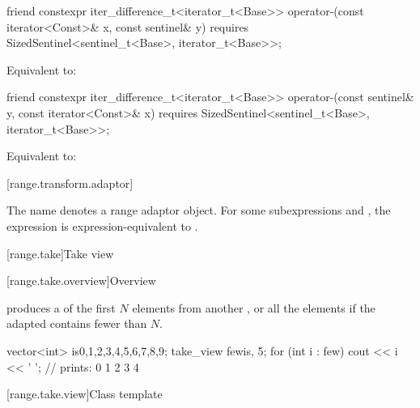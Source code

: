 %
\begin{itemdecl}
friend constexpr iter_difference_t<iterator_t<Base>>
  operator-(const iterator<Const>& x, const sentinel& y)
    requires SizedSentinel<sentinel_t<Base>, iterator_t<Base>>;
\end{itemdecl}

\begin{itemdescr}
\pnum
\effects Equivalent to: 
\end{itemdescr}

%
\begin{itemdecl}
friend constexpr iter_difference_t<iterator_t<Base>>
  operator-(const sentinel& y, const iterator<Const>& x)
    requires SizedSentinel<sentinel_t<Base>, iterator_t<Base>>;
\end{itemdecl}

\begin{itemdescr}
\pnum
\effects Equivalent to: 
\end{itemdescr}

[range.transform.adaptor]{}

\pnum
The name  denotes a
range adaptor object.
For some subexpressions  and , the expression
 is expression-equivalent to
.


[range.take]{Take view}

[range.take.overview]{Overview}

\pnum
{} produces a  of the first $N$ elements
from another , or all the elements if the adapted
 contains fewer than $N$.

\pnum
\begin{example}
\begin{codeblock}
vector<int> is{0,1,2,3,4,5,6,7,8,9};
take_view few{is, 5};
for (int i : few)
  cout << i << ' '; // prints: 0 1 2 3 4
\end{codeblock}
\end{example}

[range.take.view]{Class template }

